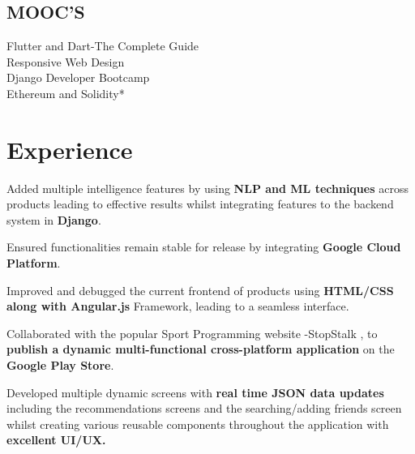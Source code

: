 \documentclass[]{deedy-resume-openfont}
\begin{document}
\begin{minipage}[t]{0.30\textwidth}
\subsection{MOOC'S}
Flutter and Dart-The Complete Guide \\
Responsive Web Design \\
Django Developer Bootcamp\\
Ethereum and Solidity*\\

%
%

\end{minipage} 
\hfill
\begin{minipage}[t]{0.69\textwidth} 


\section{Experience}
\vspace{\topsep} %
\begin{tightemize}
\item Added multiple intelligence features by using \textbf{NLP and ML techniques} across products leading to effective results whilst integrating features to the backend system in \textbf{Django}.
\item Ensured functionalities remain stable for release by integrating \textbf{Google Cloud Platform}.
\item Improved and debugged the current frontend of products using \textbf{HTML/CSS along with Angular.js} Framework, leading to a seamless interface.
\end{tightemize}
{}
\begin{tightemize}
\item Collaborated with the popular Sport Programming website -StopStalk , to \textbf{publish a dynamic multi-functional cross-platform application} on the \textbf{Google Play Store}.
\item Developed multiple dynamic screens with \textbf{real time JSON data updates} including the recommendations screens and the searching/adding friends screen whilst creating various reusable components throughout the application with \textbf{excellent UI/UX.}
\end{tightemize}

\end{minipage}
\end{document}
